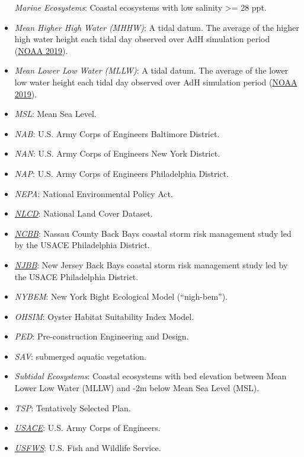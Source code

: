 \documentclass[
]{book}
\begin{document}
\begin{itemize}
  \emph{Marine Ecosystems}: Coastal ecosystems with low salinity \textgreater= 28 ppt.
\item
  \emph{Mean Higher High Water (MHHW)}: A tidal datum. The average of the higher high water height each tidal day observed over AdH simulation period (\href{https://shoreline.noaa.gov/glossary.html}{NOAA 2019}).
\item
  \emph{Mean Lower Low Water (MLLW)}: A tidal datum. The average of the lower low water height each tidal day observed over AdH simulation period (\href{https://shoreline.noaa.gov/glossary.html}{NOAA 2019}).
\item
  \emph{MSL}: Mean Sea Level.
\item
  \emph{NAB}: U.S. Army Corps of Engineers Baltimore District.
\item
  \emph{NAN}: U.S. Army Corps of Engineers New York District.
\item
  \emph{NAP}: U.S. Army Corps of Engineers Philadelphia District.
\item
  \emph{NEPA}: National Environmental Policy Act.
\item
  \emph{\href{https://www.usgs.gov/centers/eros/science/national-land-cover-database}{NLCD}}: National Land Cover Dataset.
\item
  \emph{\href{https://www.nap.usace.army.mil/Missions/Civil-Works/Nassau-County-Back-Bays-Study/}{NCBB}}: Nassau County Back Bays coastal storm risk management study led by the USACE Philadelphia District.
\item
  \emph{\href{https://www.nap.usace.army.mil/Missions/Civil-Works/New-Jersey-Back-Bays-Study/}{NJBB}}: New Jersey Back Bays coastal storm risk management study led by the USACE Philadelphia District.
\item
  \emph{NYBEM}: New York Bight Ecological Model (``nigh-bem'').
\item
  \emph{OHSIM}: Oyster Habitat Suitability Index Model.
\item
  \emph{PED}: Pre-construction Engineering and Design.
\item
  \emph{SAV}: submerged aquatic vegetation.
\item
  \emph{Subtidal Ecosystems}: Coastal ecosystems with bed elevation between Mean Lower Low Water (MLLW) and -2m below Mean Sea Level (MSL).
\item
  \emph{TSP}: Tentatively Selected Plan.
\item
  \emph{\href{https://www.usace.army.mil/}{USACE}}: U.S. Army Corps of Engineers.
\item
  \emph{\href{https://fws.gov/}{USFWS}}: U.S. Fish and Wildlife Service.
\end{itemize}
\end{document}
